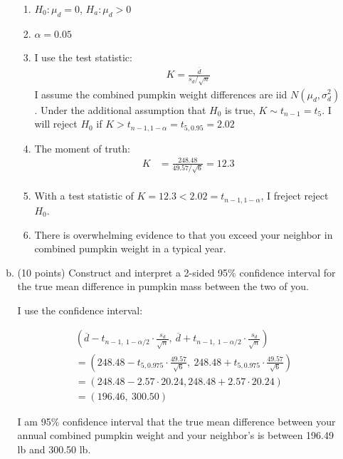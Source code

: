 \documentclass{article}\usepackage{graphicx, color}
\providecommand{\ov}[1]{\overline{#1}}
\numberwithin{equation}{section}
\begin{document}
\begin{flushleft}
\begin{enumerate}[1. ]
\begin{enumerate}[a. ]
{\begin{enumerate}[1. ]
\item $H_0: \mu_d = 0$, $H_a: \mu_d > 0$
\item $\alpha = 0.05$
\item I use the test statistic:
\begin{align*}
K = \frac{\ov{d}}{s_d/\sqrt{n}}
\end{align*}
I assume the combined pumpkin weight differences are iid $N(\mu_d, \sigma_d^2)$. Under the additional assumption that $H_0$ is true, $K \sim t_{n - 1} = t_5$. I will reject $H_0$ if $K > t_{n - 1, 1 - \alpha} = t_{5, 0.95} = 2.02$
\item The moment of truth:
\begin{align*}
K &= \frac{248.48}{49.57/\sqrt{6}} = 12.3 \\
\end{align*} 
\item With a test statistic of $K =12.3 < 2.02 = t_{n - 1, 1 - \alpha}$, I freject reject $H_0$. 
\item There is overwhelming evidence to that you exceed your neighbor in combined pumpkin weight in a typical year.
\end{enumerate}}

\item (10 points) Construct and interpret a 2-sided 95\% confidence interval for the true mean difference in pumpkin mass between the two of you.

{\color{red}

I use the confidence interval: 

\begin{align*}
&(\ov{d} - t_{n - 1, \ 1 - \alpha/2} \cdot \frac{s_d}{\sqrt{n}}, \ \ov{d} + t_{n - 1, \ 1 - \alpha/2} \cdot \frac{s_d}{\sqrt{n}}) \\
&= (248.48 - t_{5, 0.975} \cdot \frac{49.57}{\sqrt{6}} , \ 248.48+ t_{5, 0.975} \cdot \frac{49.57}{\sqrt{6}} )\\
&= (248.48 - 2.57 \cdot 20.24, 248.48 + 2.57 \cdot  20.24) \\
&= (196.46,\  300.50)
\end{align*}

I am 95\% confidence interval that the true mean difference between your annual combined pumpkin weight and your neighbor's is between 196.49 lb and  300.50 lb. 
}


\end{enumerate}








\end{enumerate}
\end{flushleft}
\end{document}
